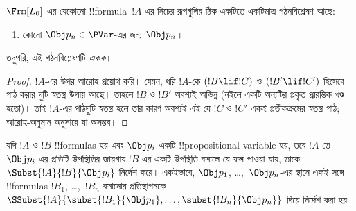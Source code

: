 \documentclass[../../../include/open-logic-section]{subfiles}
\begin{document}
\begin{prop}[একক পাঠযোগ্যতা]
$ \Frm[L_0]$-এর যেকোনো !!{formula}~$!A$-এর নিচের রূপগুলির ঠিক একটিতে
একটিমাত্র গঠনবিশ্লেষণ আছে:
\begin{enumerate}


\item কোনো $\Obj p_n \in  \PVar$-এর জন্য $\Obj p_n$।





\end{enumerate}
তদুপরি, এই গঠনবিশ্লেষণটি \emph{একক}।
\end{prop}

\begin{proof}
$!A$-এর উপর আরোহ প্রয়োগ করি। যেমন, ধরি $!A$-কে $(!B \lif !C)$ ও
$(!B' \lif !C')$ হিসেবে পাঠ করার দুটি স্বতন্ত্র উপায় আছে। তাহলে $!B$ ও
$!B'$ অবশ্যই অভিন্ন (নইলে একটি অন্যটির প্রকৃত প্রারম্ভিক খণ্ড হতো)। তাই
$!A$-এর পাঠদুটি স্বতন্ত্র হলে তার কারণ অবশ্যই এই যে $!C$ ও $!C'$ একই
প্রতীকক্রমের স্বতন্ত্র পাঠ; আরোহ-অনুমান অনুসারে যা অসম্ভব।
\end{proof}


\begin{defn}[সমরূপ প্রতিস্থাপন]
যদি $!A$ ও $!B$ !!{formula}s হয় এবং $\Obj p_i$ একটি !!{propositional
variable} হয়, তবে $!A$-তে $\Obj p_i$-এর প্রতিটি উপস্থিতির জায়গায়
$!B$-এর একটি উপস্থিতি বসালে যে ফল পাওয়া যায়, তাকে
$\Subst{!A}{!B}{\Obj p_i}$ নির্দেশ করে। একইভাবে, $\Obj p_1$, \dots,~$\Obj p_n$-এর
স্থানে একই সঙ্গে !!{formula}s $!B_1$, \dots,~$!B_n$ বসানোর প্রতিস্থাপনকে
$\SSubst{!A}{\subst{!B_1}{\Obj p_1},\dots,\subst{!B_n}{\Obj p_n}}$
দিয়ে নির্দেশ করা হয়।
\end{defn}
\end{document}

